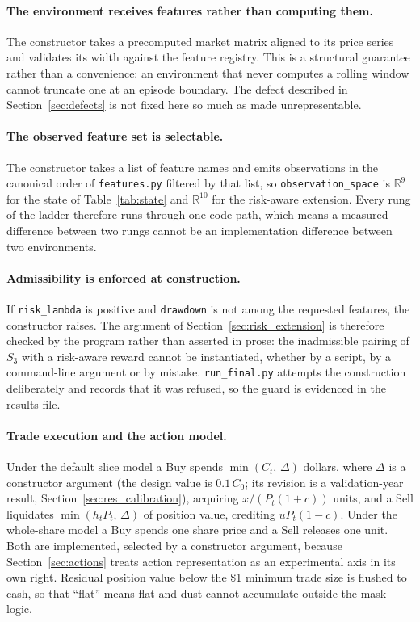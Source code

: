 \paragraph{The environment receives features rather than computing them.}
The constructor takes a precomputed market matrix aligned to its price
series and validates its width against the feature registry. This is a
structural guarantee rather than a convenience: an environment that never
computes a rolling window cannot truncate one at an episode boundary. The
defect described in Section~\ref{sec:defects} is not fixed here so much as
made unrepresentable.

\paragraph{The observed feature set is selectable.} The constructor takes
a list of feature names and emits observations in the canonical order of
\texttt{features.py} filtered by that list, so
\texttt{observation\_space} is $\mathbb{R}^9$ for the state of
Table~\ref{tab:state} and $\mathbb{R}^{10}$ for the risk-aware extension.
Every rung of the ladder therefore runs through one code path, which means a
measured difference between two rungs cannot be an implementation
difference between two environments.

\paragraph{Admissibility is enforced at construction.} If
\texttt{risk\_lambda} is positive and \texttt{drawdown} is not among the
requested features, the constructor raises. The argument of
Section~\ref{sec:risk_extension} is therefore checked by the program rather
than asserted in prose: the inadmissible pairing of $S_3$ with a
risk-aware reward cannot be instantiated, whether by a script, by a
command-line argument or by mistake. \texttt{run\_final.py} attempts the
construction deliberately and records that it was refused, so the guard is
evidenced in the results file.

\paragraph{Trade execution and the action model.} Under the default slice
model a Buy spends $\min(C_t,\, \Delta)$ dollars, where $\Delta$ is a
constructor argument (the design value is $0.1\,C_0$; its revision is a
validation-year result, Section~\ref{sec:res_calibration}), acquiring
$x/(P_t(1+c))$ units, and a Sell liquidates
$\min(h_t P_t,\, \Delta)$ of position value, crediting $u P_t (1-c)$. Under
the whole-share model a Buy spends one share price and a Sell releases one
unit. Both are implemented, selected by a constructor argument, because
Section~\ref{sec:actions} treats action representation as an experimental
axis in its own right. Residual position value below the \$1 minimum trade
size is flushed to cash, so that ``flat'' means flat and dust cannot
accumulate outside the mask logic.

